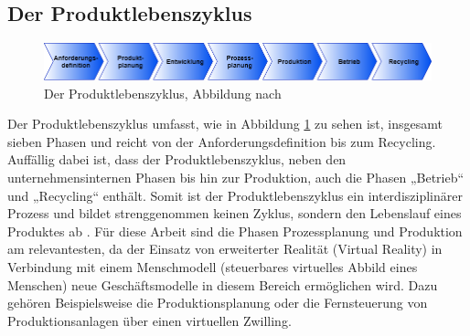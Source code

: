 \subsection{Der Produktlebenszyklus}\label{sec:Produktlebenszyklus}
\begin{figure}[h]
	\centering
	\includegraphics[width=1\linewidth]{Bilder/A8_Produktlebenszyklus}
	\caption{Der Produktlebenszyklus, Abbildung nach \cite[S.3]{13}}
	\label{fig:Produktlebenszyklus}
\end{figure}
\noindent Der Produktlebenszyklus umfasst, wie in Abbildung \ref{fig:Produktlebenszyklus} zu sehen ist, insgesamt sieben Phasen und reicht von der Anforderungsdefinition bis zum Recycling. Auffällig dabei ist, dass der Produktlebenszyklus, neben den unternehmensinternen Phasen bis hin zur Produktion, auch die Phasen „Betrieb“ und „Recycling“ enthält. Somit ist der Produktlebenszyklus ein interdisziplinärer Prozess und bildet strenggenommen keinen Zyklus, sondern den Lebenslauf eines Produktes ab \cite[S.3]{13}.
\newline
Für diese Arbeit sind die Phasen Prozessplanung und Produktion am relevantesten, da der Einsatz von erweiterter Realität (Virtual Reality) in Verbindung mit einem Menschmodell (steuerbares virtuelles Abbild eines Menschen) neue Geschäftsmodelle in diesem Bereich ermöglichen wird. Dazu gehören Beispielsweise die Produktionsplanung oder die Fernsteuerung von Produktionsanlagen über einen virtuellen Zwilling.

